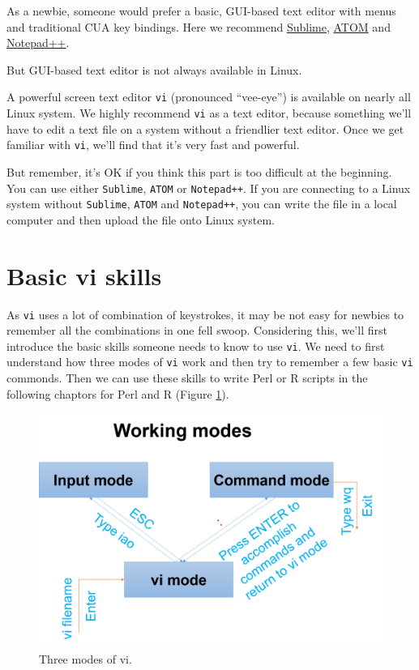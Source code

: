 \documentclass[]{book}
\begin{document}
As a newbie, someone would prefer a basic, GUI-based text editor with menus and traditional CUA key bindings. Here we recommend \href{https://www.sublimetext.com/}{Sublime}, \href{https://atom.io}{ATOM} and \href{https://notepad-plus-plus.org/}{Notepad++}.

But GUI-based text editor is not always available in Linux.

A powerful screen text editor \texttt{vi} (pronounced ``vee-eye'') is available on nearly all Linux system. We highly recommend \texttt{vi} as a text editor, because something we'll have to edit a text file on a system without a friendlier text editor. Once we get familiar with \texttt{vi}, we'll find that it's very fast and powerful.

But remember, it's OK if you think this part is too difficult at the beginning. You can use either \texttt{Sublime}, \texttt{ATOM} or \texttt{Notepad++}. If you are connecting to a Linux system without \texttt{Sublime}, \texttt{ATOM} and \texttt{Notepad++}, you can write the file in a local computer and then upload the file onto Linux system.

\hypertarget{basic-vi-skills}{%
\section{Basic vi skills}\label{basic-vi-skills}}

As \texttt{vi} uses a lot of combination of keystrokes, it may be not easy for newbies to remember all the combinations in one fell swoop. Considering this, we'll first introduce the basic skills someone needs to know to use \texttt{vi}. We need to first understand how three modes of \texttt{vi} work and then try to remember a few basic \texttt{vi} commonds. Then we can use these skills to write Perl or R scripts in the following chaptors for Perl and R (Figure \ref{fig:workingModeVi}).



\begin{figure}
\centering
\includegraphics{figures/workingModeVi.png}
\caption{\label{fig:workingModeVi}Three modes of vi.}
\end{figure}
\end{document}
